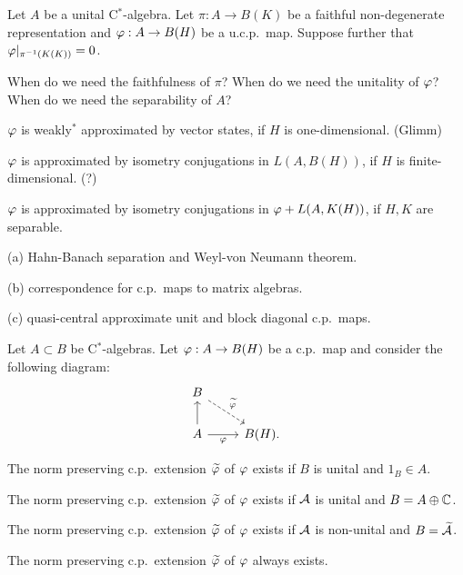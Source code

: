 \documentclass{../../large}
\begin{document}
\begin{prb}
Let $A$ be a unital C$^*$-algebra.
Let $\pi:A\to B(K)$ be a faithful non-degenerate representation and $\varphi:A\to B(H)$ be a u.c.p.~map.
Suppose further that $\varphi|_{\pi^{-1}(K(K))}=0$.

When do we need the faithfulness of $\pi$?
When do we need the unitality of $\varphi$?
When do we need the separability of $A$?
\begin{parts}
\item $\varphi$ is weakly$^*$ approximated by vector states, if $H$ is one-dimensional. (Glimm)
\item $\varphi$ is approximated by isometry conjugations in $L(A,B(H))$, if $H$ is finite-dimensional. (?)
\item $\varphi$ is approximated by isometry conjugations in $\varphi+L(A,K(H))$, if $H,K$ are separable.
\end{parts}
\end{prb}
\begin{pf}
(a)
Hahn-Banach separation and Weyl-von Neumann theorem.

(b)
correspondence for c.p.~maps to matrix algebras.

(c)
quasi-central approximate unit and block diagonal c.p.~maps.

\end{pf}


\begin{prb}
Let $A\subset B$ be C$^*$-algebras.
Let $\varphi:A\to B(H)$ be a c.p.~map and consider the following diagram:
\[\begin{tikzcd}
B\ar[dashed]{dr}{\tilde\f}&\\
A\ar{u}\ar[swap]{r}{\f}&B(H).
\end{tikzcd}\]
\begin{parts}
\item The norm preserving c.p.~extension $\widetilde{\varphi}$ of $\varphi$ exists if $B$ is unital and $1_B\in A$.
\item The norm preserving c.p.~extension $\widetilde{\varphi}$ of $\varphi$ exists if $\mathcal{A}$ is unital and $B=A\oplus\mathbb{C}$.
\item The norm preserving c.p.~extension $\widetilde{\varphi}$ of $\varphi$ exists if $\mathcal{A}$ is non-unital and $B=\widetilde{\mathcal{A}}$.
\item The norm preserving c.p.~extension $\widetilde{\varphi}$ of $\varphi$ always exists.
\end{parts}
\end{prb}
\end{document}
